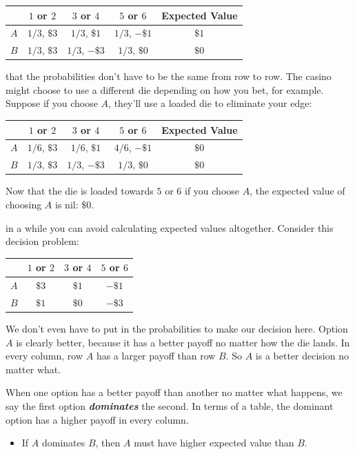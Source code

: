 \documentclass[justified]{tufte-book}
\newenvironment{info}{\begin{itemize}\item[\Info]}{\end{itemize}}
\theoremstyle{definition}
\theoremstyle{definition}
\theoremstyle{definition}
\theoremstyle{remark}
\begin{document}
\begin{longtable}[]{@{}lcccc@{}}
\toprule
& \(1\) or \(2\) & \(3\) or \(4\) & \(5\) or \(6\) & Expected
Value\tabularnewline
\midrule
\endhead
\(A\) & \(1/3\), \(\$3\) & \(1/3\), \(\$1\) & \(1/3\), \(-\$1\) &
\(\$1\)\tabularnewline
\(B\) & \(1/3\), \(\$3\) & \(1/3\), \(-\$3\) & \(1/3\), \(\$0\) &
\(\$0\)\tabularnewline
\bottomrule
\end{longtable}

 that the probabilities don't have to be the same from
row to row. The casino might choose to use a different die depending on
how you bet, for example. Suppose if you choose \(A\), they'll use a
loaded die to eliminate your edge:

\begin{longtable}[]{@{}lcccc@{}}
\toprule
& \(1\) or \(2\) & \(3\) or \(4\) & \(5\) or \(6\) & Expected
Value\tabularnewline
\midrule
\endhead
\(A\) & \(1/6\), \(\$3\) & \(1/6\), \(\$1\) & \(4/6\), \(-\$1\) &
\(\$0\)\tabularnewline
\(B\) & \(1/3\), \(\$3\) & \(1/3\), \(-\$3\) & \(1/3\), \(\$0\) &
\(\$0\)\tabularnewline
\bottomrule
\end{longtable}

Now that the die is loaded towards \(5\) or \(6\) if you choose \(A\),
the expected value of choosing \(A\) is nil: \(\$0\).

 in a while you can avoid calculating expected values
altogether. Consider this decision problem:

\begin{longtable}[]{@{}lccc@{}}
\toprule
& \(1\) or \(2\) & \(3\) or \(4\) & \(5\) or \(6\)\tabularnewline
\midrule
\endhead
\(A\) & \(\$3\) & \(\$1\) & \(-\$1\)\tabularnewline
\(B\) & \(\$1\) & \(\$0\) & \(-\$3\)\tabularnewline
\bottomrule
\end{longtable}

We don't even have to put in the probabilities to make our decision
here. Option \(A\) is clearly better, because it has a better payoff no
matter how the die lands. In every column, row \(A\) has a larger payoff
than row \(B\). So \(A\) is a better decision no matter what.

When one option has a better payoff than another no matter what happens,
we say the first option \textbf{\emph{dominates}} the second. In terms
of a table, the dominant option has a higher payoff in every column.

\begin{info}
If \(A\) dominates \(B\), then \(A\) must have higher expected value
than \(B\).
\end{info}
\end{document}
